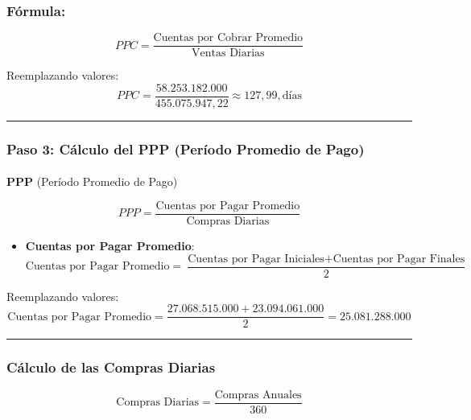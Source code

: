 \documentclass[
  letterpaper,
  DIV=11,
  numbers=noendperiod]{scrartcl}
\makeatletter
\let\oldparagraph\paragraph
\renewcommand{\paragraph}{
    \@ifstar
      \xxxParagraphStar
      \xxxParagraphNoStar
  }
\newcommand{\xxxParagraphStar}[1]{\oldparagraph*{#1}\mbox{}}
\newcommand{\xxxParagraphNoStar}[1]{\oldparagraph{#1}\mbox{}}
\providecommand{\tightlist}{%
  \setlength{\itemsep}{0pt}\setlength{\parskip}{0pt}}\usepackage{longtable,booktabs,array}
\makeatother
\begin{document}
\subsubsection{Fórmula:}\label{fuxf3rmula}

\[
PPC = \frac{\text{Cuentas por Cobrar Promedio}}{\text{Ventas Diarias}}
\]

Reemplazando valores: \[
PPC = \frac{58.253.182.000}{455.075.947,22} \approx 127,99 , \text{días}
\]

\begin{center}\rule{0.5\linewidth}{0.5pt}\end{center}

\subsubsection{\texorpdfstring{Paso 3: Cálculo del \textbf{PPP} (Período
Promedio de
Pago)}{Paso 3: Cálculo del PPP (Período Promedio de Pago)}}\label{paso-3-cuxe1lculo-del-ppp-peruxedodo-promedio-de-pago}

\paragraph{\texorpdfstring{\textbf{PPP} (Período Promedio de
Pago)}{PPP (Período Promedio de Pago)}}\label{ppp-peruxedodo-promedio-de-pago}

\[
PPP = \frac{\text{Cuentas por Pagar Promedio}}{\text{Compras Diarias}}
\]

\begin{itemize}
\tightlist
\item
  \textbf{Cuentas por Pagar Promedio}: \[
  \text{Cuentas por Pagar Promedio} = \frac{\text{Cuentas por Pagar Iniciales} + \text{Cuentas por Pagar Finales}}{2}
  \]
\end{itemize}

Reemplazando valores: \[
\text{Cuentas por Pagar Promedio} = \frac{27.068.515.000 + 23.094.061.000}{2} = 25.081.288.000
\]

\begin{center}\rule{0.5\linewidth}{0.5pt}\end{center}

\subsubsection{Cálculo de las Compras
Diarias}\label{cuxe1lculo-de-las-compras-diarias}

\[
\text{Compras Diarias} = \frac{\text{Compras Anuales}}{360}
\]
\end{document}
